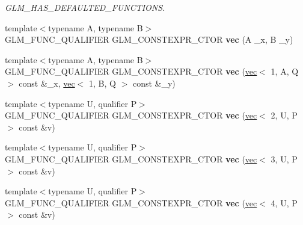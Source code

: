 \begin{DoxyCompactItemize}
\begin{DoxyCompactList}\small\item\em G\+L\+M\+\_\+\+H\+A\+S\+\_\+\+D\+E\+F\+A\+U\+L\+T\+E\+D\+\_\+\+F\+U\+N\+C\+T\+I\+O\+NS. \end{DoxyCompactList}\item 
\mbox{\label{structglm_1_1vec_3_012_00_01T_00_01Q_01_4_a161096cd80858035c7375517507e97c4}} 
{\footnotesize template$<$typename A, typename B$>$ }\\G\+L\+M\+\_\+\+F\+U\+N\+C\+\_\+\+Q\+U\+A\+L\+I\+F\+I\+ER G\+L\+M\+\_\+\+C\+O\+N\+S\+T\+E\+X\+P\+R\+\_\+\+C\+T\+OR {\bfseries vec} (A \+\_\+x, B \+\_\+y)
\item 
\mbox{\label{structglm_1_1vec_3_012_00_01T_00_01Q_01_4_a2801c2c65b9d873d5d5008688f7339a6}} 
{\footnotesize template$<$typename A, typename B$>$ }\\G\+L\+M\+\_\+\+F\+U\+N\+C\+\_\+\+Q\+U\+A\+L\+I\+F\+I\+ER G\+L\+M\+\_\+\+C\+O\+N\+S\+T\+E\+X\+P\+R\+\_\+\+C\+T\+OR {\bfseries vec} (\hyperlink{structglm_1_1vec}{vec}$<$ 1, A, Q $>$ const \&\+\_\+x, \hyperlink{structglm_1_1vec}{vec}$<$ 1, B, Q $>$ const \&\+\_\+y)
\item 
\mbox{\label{structglm_1_1vec_3_012_00_01T_00_01Q_01_4_aa42a169b552cd4f61ee71641723d2d9b}} 
{\footnotesize template$<$typename U, qualifier P$>$ }\\G\+L\+M\+\_\+\+F\+U\+N\+C\+\_\+\+Q\+U\+A\+L\+I\+F\+I\+ER G\+L\+M\+\_\+\+C\+O\+N\+S\+T\+E\+X\+P\+R\+\_\+\+C\+T\+OR {\bfseries vec} (\hyperlink{structglm_1_1vec}{vec}$<$ 2, U, P $>$ const \&v)
\item 
\mbox{\label{structglm_1_1vec_3_012_00_01T_00_01Q_01_4_ac6f3c81265603dd5c06c75776911aff4}} 
{\footnotesize template$<$typename U, qualifier P$>$ }\\G\+L\+M\+\_\+\+F\+U\+N\+C\+\_\+\+Q\+U\+A\+L\+I\+F\+I\+ER G\+L\+M\+\_\+\+C\+O\+N\+S\+T\+E\+X\+P\+R\+\_\+\+C\+T\+OR {\bfseries vec} (\hyperlink{structglm_1_1vec}{vec}$<$ 3, U, P $>$ const \&v)
\item 
\mbox{\label{structglm_1_1vec_3_012_00_01T_00_01Q_01_4_a369d48c9ccf09e6ef21f17178abf9f81}} 
{\footnotesize template$<$typename U, qualifier P$>$ }\\G\+L\+M\+\_\+\+F\+U\+N\+C\+\_\+\+Q\+U\+A\+L\+I\+F\+I\+ER G\+L\+M\+\_\+\+C\+O\+N\+S\+T\+E\+X\+P\+R\+\_\+\+C\+T\+OR {\bfseries vec} (\hyperlink{structglm_1_1vec}{vec}$<$ 4, U, P $>$ const \&v)

\end{DoxyCompactItemize}
